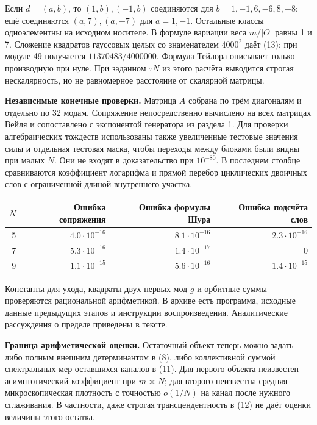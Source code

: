 \documentclass[11pt,a4paper]{article}
\newcommand{\subt}[1]{\par\medskip\noindent\textbf{#1.}\quad}
\begin{document}
Если $d=(a,b)$, то $(1,b),(-1,b)$ соединяются для $b=1,-1,6,-6,8,-8$; ещё соединяются $(a,7),(a,-7)$ для $a=1,-1$. Остальные классы одноэлементны на исходном носителе. В формуле вариации веса $m/|O|$ равны 1 и 7. Сложение квадратов гауссовых целых со знаменателем $4000^2$ даёт (13); при модуле 49 получается $11370483/4000000$. Формула Тейлора описывает только производную при нуле. При заданном $\tau N$ из этого расчёта выводится строгая нескалярность, но не равномерное расстояние от скалярной матрицы.

\subt{Независимые конечные проверки} Матрица $A$ собрана по трём диагоналям и отдельно по 32 модам. Сопряжение непосредственно вычислено на всех матрицах Вейля и сопоставлено с экспонентой генератора из раздела 1. Для проверки алгебраических тождеств использованы также увеличенные тестовые значения силы и отдельная тестовая маска, чтобы переходы между блоками были видны при малых $N$. Они не входят в доказательство при $10^{-80}$. В последнем столбце сравниваются коэффициент логарифма и прямой перебор циклических двоичных слов с ограниченной длиной внутреннего участка.
\begin{center}\small\begin{tabular}{@{}rrrr@{}}\toprule
$N$ & Ошибка сопряжения & Ошибка формулы Шура & Ошибка подсчёта слов \\ \midrule
5 & $4.0\cdot10^{-16}$ & $8.1\cdot10^{-16}$ & $2.3\cdot10^{-16}$ \\
7 & $5.3\cdot10^{-16}$ & $1.4\cdot10^{-17}$ & 0 \\
9 & $1.1\cdot10^{-15}$ & $5.6\cdot10^{-16}$ & $1.4\cdot10^{-15}$ \\ \bottomrule
\end{tabular}\end{center}
Константы для ухода, квадраты двух первых мод $g$ и орбитные суммы проверяются рациональной арифметикой. В архиве есть программа, исходные данные предыдущих этапов и инструкции воспроизведения. Аналитические рассуждения о пределе приведены в тексте.

\subt{Граница арифметической оценки} Остаточный объект теперь можно задать либо полным внешним детерминантом в (8), либо коллективной суммой спектральных мер оставшихся каналов в (11). Для первого объекта неизвестен асимптотический коэффициент при $m\asymp N$; для второго неизвестна средняя микроскопическая плотность с точностью $o(1/N)$ на канал после нужного сглаживания. В частности, даже строгая трансцендентность в (12) не даёт оценки величины этого остатка.
\end{document}
